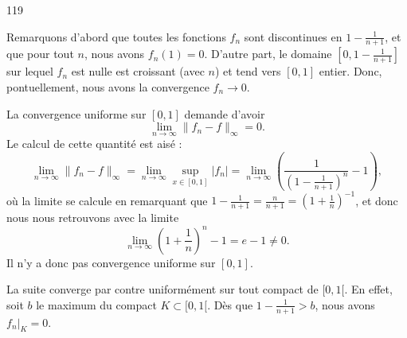 

\begin{corrige}{119}


%

Remarquons d'abord que toutes les fonctions $f_{n}$ sont discontinues en $1-\frac{1}{ n+1 }$, et que pour tout $n$, nous avons $f_n(1)=0$. D'autre part, le domaine $[0,1-\frac{1}{ n+1 }]$ sur lequel $f_n$ est nulle est croissant (avec $n$) et tend vers $[0,1]$ entier. Donc, pontuellement, nous avons la convergence $f_n\to 0$.

La convergence uniforme sur $[0,1]$ demande d'avoir
\begin{equation}
	\lim_{n\to\infty}\| f_n-f \|_{\infty}=0.
\end{equation}
Le calcul de cette quantité est aisé :
\begin{equation}
	\lim_{n\to\infty}\| f_n-f \|_{\infty}=\lim_{n\to\infty}\sup_{x\in[0,1]}| f_n |=\lim_{n\to\infty}\left( \frac{1}{ \left( 1-\frac{ 1 }{ n+1 } \right)^n }-1 \right),
\end{equation}
où la limite se calcule en remarquant que $1-\frac{ 1 }{ n+1 }=\frac{ n }{ n+1 }=\left( 1+\frac{ 1 }{ n }\right)^{-1}$, et donc nous nous retrouvons avec la limite
\begin{equation}
	\lim_{n\to\infty}\left( 1+\frac{1}{ n } \right)^n-1=e-1\neq 0.
\end{equation}
Il n'y a donc pas convergence uniforme sur $[0,1]$.

La suite converge par contre uniformément sur tout compact de $[0,1[$. En effet, soit $b$ le maximum du compact $K\subset[0,1[$. Dès que $1-\frac{ 1 }{ n+1 }>b$, nous avons $f_{n}|_{K}=0$.

\end{corrige}
